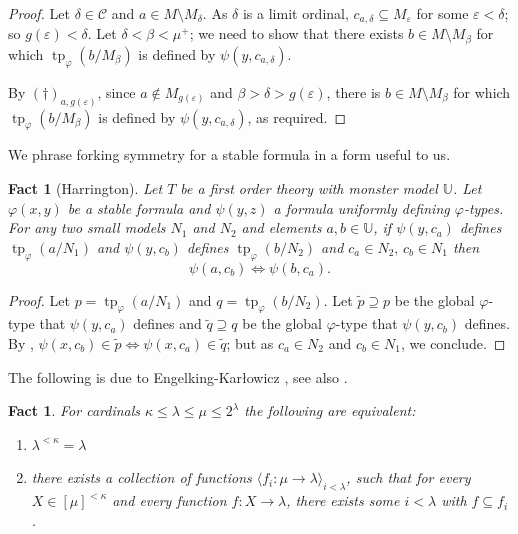 \documentclass[a4paper]{amsart}
\theoremstyle{plain}
\newtheorem{fact}[theorem]{Fact}
\theoremstyle{definition}
\theoremstyle{remark}
\numberwithin{equation}{section}
\DeclareMathOperator{\tp}{tp}
\begin{document}
\begin{proof}
Let $\delta\in \mathcal{C}$ and $a\in M\setminus M_\delta$. As $\delta$ is a limit ordinal, $c_{a,\delta}\subseteq M_\varepsilon$ for some $\varepsilon<\delta$; so $g(\varepsilon)<\delta$. Let $\delta<\beta<\mu^+$; we need to show that there exists $b\in M\setminus M_\beta$ for which $\tp_\varphi(b/M_\beta)$ is defined by $\psi(y,c_{a,\delta})$.

By $(\dagger)_{a,g(\varepsilon)}$, since $a\notin M_{g(\varepsilon)}$ and $\beta>\delta>g(\varepsilon)$, there is $b\in M\setminus M_\beta$ for which  $\tp_\varphi(b/M_\beta)$ is defined by $\psi(y,c_{a,\delta})$, as required.
\end{proof}


We phrase forking symmetry for a stable formula in a form useful to us.
\begin{fact}[Harrington]\label{F:local Harrington}
Let $T$ be a first order theory with monster model $\mathbb{U}$. Let $\varphi(x,y)$ be a stable formula and $\psi(y,z)$ a formula uniformly defining $\varphi$-types. For any two small models $N_1$ and $N_2$ and elements $a,b\in \mathbb{U}$, if $\psi(y,c_a)$ defines $\tp_\varphi (a/N_1)$ and $\psi(y,c_b)$ defines $\tp_\varphi(b/N_2)$ and $c_a\in N_2,\, c_b\in N_1$ then 
\[\psi(a,c_b)\Leftrightarrow \psi(b,c_a).\]
\end{fact}
\begin{proof}
Let $p=\tp_\varphi(a/N_1)$ and $q=\tp_\varphi(b/N_2)$.
Let $\widetilde p\supseteq p$ be the global $\varphi$-type that $\psi(y,c_a)$ defines and $\widetilde q\supseteq q$ be the global $\varphi$-type that $\psi(y,c_b)$ defines. By \cite[Lemma 8.3.4]{TZ}, $\psi(x,c_b)\in \widetilde p\Leftrightarrow \psi(x,c_a)\in \widetilde q$; but as $c_a\in N_2$ and $c_b\in N_1$, we conclude.
\end{proof}

The following is due to Engelking-Kar\l owicz \cite{En-Ka}, see also \cite{Rinot}.
\begin{fact}\label{F:En-Ka}
For cardinals $\kappa\leq \lambda\leq \mu\leq 2^\lambda$ the following are equivalent:
\begin{enumerate}
\item $\lambda^{<\kappa}=\lambda$
\item there exists a collection of functions $\langle f_i:\mu\to \lambda\rangle_{i<\lambda}$, such that for every $X\in [\mu]^{<\kappa}$ and every function $f:X\to \lambda$, there exists some $i<\lambda$ with $f\subseteq f_i$.
\end{enumerate}
\end{fact}
\end{document}
